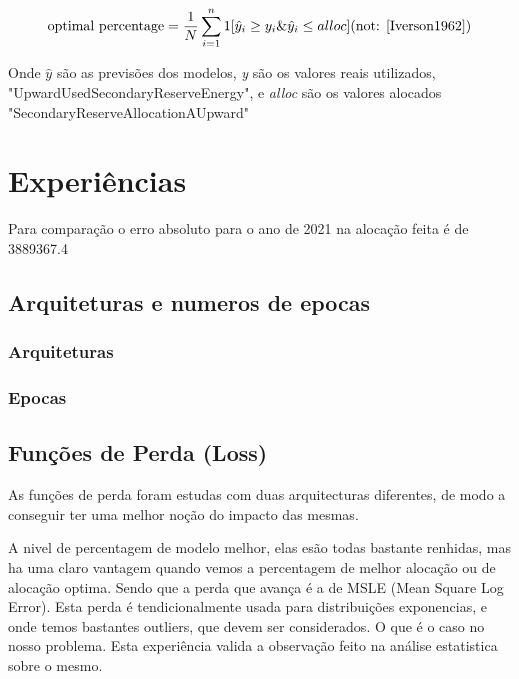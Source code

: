 \begin{equation} 
    \label{eq:eq1} 
    \text{optimal percentage} = \frac{1}{N} \sum_{i=1}^{n} 1 [\hat{y}_i \geq y_i  \&  \hat{y}_i \leq alloc]
    \text{(not: \cite{Iverson1962})}
\end{equation}


Onde \textit{$\hat{y}$} são as previsões dos modelos, \textit{y} são os valores reais utilizados, "UpwardUsedSecondaryReserveEnergy", e \textit{alloc} são os valores alocados "SecondaryReserveAllocationAUpward"


\section{Experiências\label{se:experiments}}

Para comparação o erro absoluto para o ano de 2021 na alocação feita é de 3889367.4

\subsection{Arquiteturas e numeros de epocas\label{se:archs_epocs}}

\subsubsection{Arquiteturas\label{se:archs_res}}



\resizebox{\linewidth}{!}{}

\subsubsection{Epocas\label{se:epocas_res}}

\subsection{Funções de Perda (Loss) \label{se:archs_epocs}}

As funções de perda foram estudas com duas arquitecturas diferentes, de modo a conseguir ter uma melhor noção do impacto das mesmas.

\resizebox{\linewidth}{!}{}

A nivel de percentagem de modelo melhor, elas esão todas bastante renhidas, mas ha uma claro vantagem quando vemos a percentagem de melhor alocação ou de alocação optima.
Sendo que a perda que avança é a de MSLE (Mean Square Log Error).
Esta perda é tendicionalmente usada para distribuições exponencias, e onde temos bastantes outliers, que devem ser considerados. O que é o caso no nosso problema.
Esta experiência valida a observação feito na análise estatistica sobre o mesmo.

